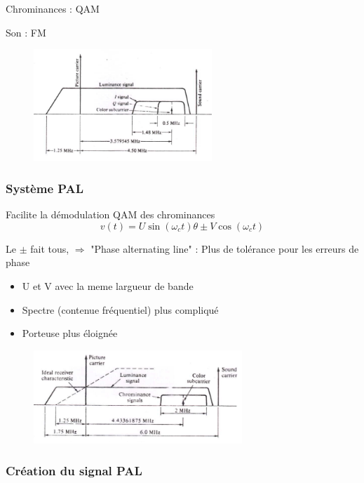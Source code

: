 				Chrominances : QAM
				
				Son : FM
				
				\begin{figure}[htp]
				\centering
				\includegraphics[width=0.6\textwidth]{img/NTSC.png}
				\end{figure}
			\subsubsection{Système PAL}
				Facilite la démodulation QAM des chrominances
				\begin{equation}
					v(t) = U\sin (\omega_c t) \theta \pm V \cos (\omega_c t)
				\end{equation}
				
				Le $\pm$ fait tous, $\Rightarrow$ "Phase alternating line" : Plus de tolérance pour les erreurs de phase
				
				\begin{itemize}
					\item U et V avec la meme largueur de bande
					\item Spectre (contenue fréquentiel) plus compliqué
					\item Porteuse plus éloignée
				\end{itemize}
				
				\begin{figure}[htp]
				\centering
				\includegraphics[width=0.7\textwidth]{img/PAL.png}
				\end{figure}
				
			\subsubsection{Création du signal PAL}
			
